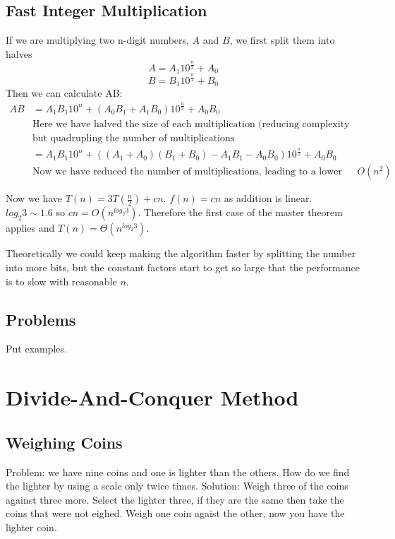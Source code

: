 \documentclass[a4paper]{article}
\begin{document}
\subsection{Fast Integer Multiplication}
If we are multiplying two n-digit numbers, $A$ and $B$, we first split them into halves $$A = A_1 10^\frac{n}{2} + A_0$$ $$B = B_1 10^\frac{n}{2} + B_0$$
Then we can calculate AB:
\begin{align*}
		AB &= A_1 B_1 10^n + (A_0 B_1 + A_1 B_0) 10^\frac{n}{2} + A_0 B_0 \\
		& \text{Here we have halved the size of each multiplication (reducing complexity by fourfold)} \\
		& \text{but quadrupling the number of multiplications} \\
		&= A_1 B_1 10^n + ((A_1 + A_0)(B_1 + B_0) - A_1 B_1 - A_0 B_0) 10^\frac{n}{2} + A_0 B_0 \\
		& \text{Now we have reduced the number of multiplications, leading to a lower complexity than $O(n^2)$}
\end{align*}

Now we have $T(n) = 3T(\frac{n}{2}) + cn$. $f(n) = cn$ as addition is linear. $log_2 3 \sim 1.6$ so $ cn = O(n^{log_{2} 3})$. Therefore the first case of the master theorem applies and $T(n) = \Theta(n^{log_{2} 3})$.

Theoretically we could keep making the algorithm faster by splitting the number into more bits, but the constant factors start to get so large that the performance is to slow with reasonable $n$.

\subsection{Problems}
Put examples.

\section{Divide-And-Conquer Method}

\subsection{Weighing Coins}
Problem: we have nine coins and one is lighter than the others. How do we find the lighter by using a scale only twice times.
Solution: Weigh three of the coins against three more. Select the lighter three, if they are the same then take the coins that were not eighed. Weigh one coin agaist the other, now you have the lighter coin.
\end{document}
